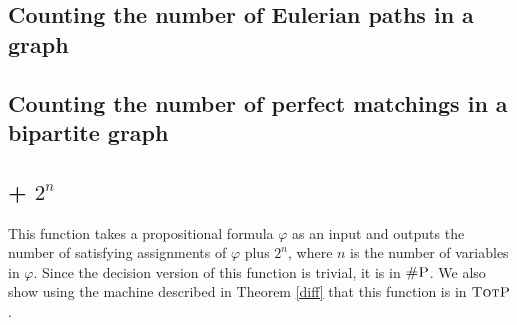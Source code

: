 \subsection{Counting the number of Eulerian paths in a graph}

\subsection{Counting the number of perfect matchings in a bipartite graph}

\subsection{\shsat + $2^n$}

This function takes a propositional formula $\varphi$ as an input and outputs the number of satisfying assignments of $\varphi$ plus $2^n$, where $n$ is the number of variables in $\varphi$. Since the decision version of this function is trivial, it is in $\textsc{\#P}$. We also show using the machine described in Theorem \ref{diff} that this function is in $\textsc{TotP}$.
